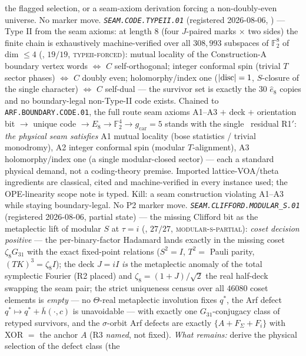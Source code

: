 \documentclass[11pt,a4paper]{article}
\newcommand{\gcar}{g_{\mathrm{car}}}
\begin{document}
the flagged selection, or a seam-axiom derivation forcing a
non-doubly-even universe.  No marker move.
\emph{\texttt{SEAM.CODE.TYPEII.01}} (registered 2026-08-06, \mC)
--- Type II from the seam axioms: at length $8$ (four $J$-paired
marks $\times$ two sides) the finite chain is exhaustively
machine-verified over all $308{,}993$ subspaces of
$\mathbb F_2^8$ of dim $\le4$
(, $19/19$,
\textsc{typeii-forced}): mutual locality of the Construction-A
boundary vertex words $\iff$ $C$ self-orthogonal; integer
conformal spin (trivial $T$ sector phases) $\iff$ $C$ doubly even;
holomorphy/index one ($|{\rm disc}|=1$, $S$-closure of the single
character) $\iff$ $C$ self-dual --- the survivor set is exactly
the $30$ $\hat e_8$ copies and no boundary-legal non-Type-II code
exists.  Chained to \texttt{ARF.BOUNDARY.CODE.01}, the full route
seam axioms A1--A3 $+$ deck $+$ orientation bit $\to$ unique code
$\to E_8\to\mathbb F_2^4\to\gcar=5$ stands with the single \mC\
residual R1$'$: \emph{the physical seam satisfies} A1 mutual
locality (bose statistics / trivial monodromy), A2 integer
conformal spin (modular $T$-alignment), A3 holomorphy/index one
(a single modular-closed sector) --- each a standard physical
demand, not a coding-theory premise.  Imported lattice-VOA/theta
ingredients are classical, cited and machine-verified in every
instance used; the OPE-linearity scope note is typed.  Kill: a
seam construction violating A1--A3 while staying boundary-legal.
No P2 marker move.
\emph{\texttt{SEAM.CLIFFORD.MODULAR\_S.01}} (registered
2026-08-06, partial state) --- the missing Clifford bit as the
metaplectic lift of modular $S$ at $\tau=i$
(, $27/27$,
\textsc{modular-s-partial}): \emph{coset decision positive} ---
the per-binary-factor Hadamard lands exactly in the missing coset
$\zeta_8G_{31}$ with the exact fixed-point relations ($S^2=I$,
$T^2=$ Pauli parity, $(TK)^3=\zeta_8I$); the deck $J=iI$ \emph{is}
the metaplectic anomaly of the total symplectic Fourier (R2
placed) and $\zeta_8=(1{+}J)/\sqrt2$ the real half-deck swapping
the seam pair; the strict uniqueness census over all $46080$ coset
elements is \emph{empty} --- no $\Theta$-real metaplectic
involution fixes $q^{*}$, the Arf defect
$q^{*}\mapsto q^{*}+\bar h(\cdot,c)$ is unavoidable --- with
exactly one $G_{31}$-conjugacy class of retyped survivors, and the
$\sigma$-orbit Arf defects are exactly $\{A+F_\Sigma+F_i\}$ with
XOR $=$ the anchor $A$ (R3 \emph{named}, not fixed).  \emph{What
remains:} derive the physical selection of the defect class (the
\end{document}

